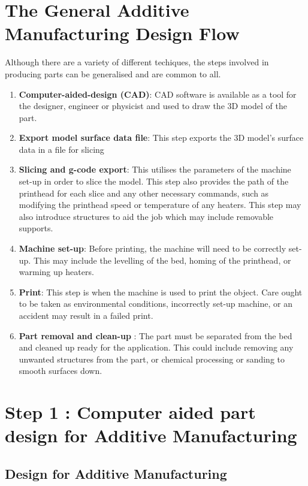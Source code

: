 \section{The General Additive Manufacturing Design Flow}


Although there are a variety of different techiques, the steps involved in producing parts can be generalised and are common to all. 

\begin{enumerate}
 \item  \textbf{Computer-aided-design (CAD)}: CAD software is available as a tool for the designer, engineer or physicist and used to draw the 3D model of the part. 
 \item  \textbf{Export model surface data file}: This step exports the 3D model's surface data in a file for slicing
 \item  \textbf{Slicing and g-code export}: This utilises the parameters of the machine set-up in order to slice the model. This step also provides the path of the printhead for each slice and any other necessary commands, such as modifying the printhead speed or temperature of any heaters. This step may also introduce structures to aid the job which may include removable supports. 
 \item  \textbf{Machine set-up}: Before printing, the machine will need to be correctly set-up. This may include the levelling of the bed, homing of the printhead, or warming up heaters. 
 \item \textbf{Print}: This step is when the machine is used to print the object. Care ought to be taken as environmental conditions, incorrectly set-up machine, or an accident may result in a failed print. 
 \item \textbf{Part removal and clean-up} : The part must be separated from the bed and cleaned up ready for the application. This could include removing any unwanted structures from the part, or chemical processing or sanding to smooth surfaces down. 
\end{enumerate}

\newpage
\section{Step 1 : Computer aided part design for Additive Manufacturing}

\subsection{Design for Additive Manufacturing}

